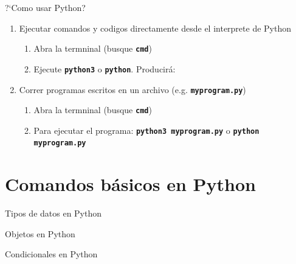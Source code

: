 \documentclass[
10pt,
aspectratio=169,
]{beamer}
\newcommand{\co}[1]{\alert{\textbf{\texttt{#1}}}}
\begin{document}
\begin{frame}[c]{?`Como usar Python?}
\begin{enumerate}
\item Ejecutar comandos y codigos directamente desde el interprete de Python

\begin{enumerate}
\item Abra la termninal (busque \co{cmd})
\item Ejecute \co{python3} o \co{python}. Producir\'a:
\end{enumerate}
\item Correr programas escritos en un archivo (e.g. \co{myprogram.py})
\begin{enumerate}
\item Abra la termninal (busque \co{cmd})
\item Para ejecutar el programa: \co{python3 myprogram.py} o \co{python myprogram.py}
\end{enumerate}

\end{enumerate}

\end{frame}



\section{Comandos b\'asicos en Python}
\begin{frame}[c]{Tipos de datos en Python}
\end{frame}

\begin{frame}[c]{Objetos en Python}
\end{frame}

\begin{frame}[c]{Condicionales en Python}
\end{frame}
\end{document}
